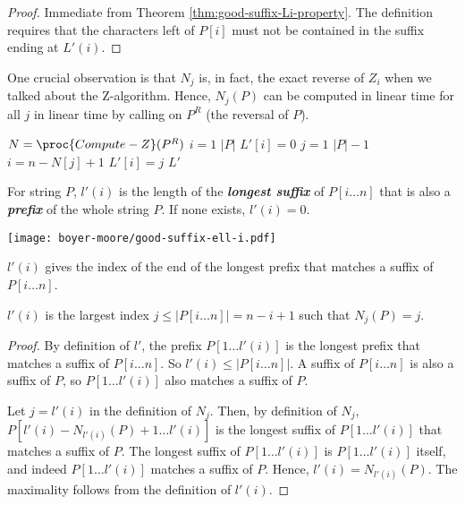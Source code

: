 \begin{proof}
    Immediate from Theorem \ref{thm:good-suffix-Li-property}. The definition requires that the characters left of $P[i]$ must not be contained in the suffix ending at $L'(i)$.
\end{proof}

One crucial observation is that $N_j$ is, in fact, the exact reverse of $Z_i$ when we talked about the Z-algorithm. Hence, $N_j(P)$ can be computed in linear time for all $j$ in linear time by calling  on $P^R$ (the reversal of $P$).

\begin{codebox}
    \li $N = \proc{Compute-Z}(P^R)$
    \li \For $i=1$ \To $|P|$ \Do
        \li $L'[i] = 0$ 
    \End
    \li \For $j = 1$ \To $|P|-1$ \Do
        \li $i = n - N[j] + 1$ 
        \li $L'[i] = j$ 
    \End
    \li \Return $L'$ 
\end{codebox}

\begin{definition}
    For string $P$, $l'(i)$ is the length of the \textit{\textbf{longest suffix}} of $P[i\ldots n]$ that is also a \textit{\textbf{prefix}} of the whole string $P$. If none exists, $l'(i)=0$.
    \begin{marginfigure}
        \texttt{[image: boyer-moore/good-suffix-ell-i.pdf]}
        \caption{$l'(i)$ gives the index of the end of the longest prefix that matches a suffix of $P[i\ldots n]$.}
        \label{fig:good-suffix-ell-i}
    \end{marginfigure}
\end{definition}

\begin{theorem} \label{thm:good-suffix-ell-i-property}
    $l'(i)$ is the largest index $j \leq |P[i\ldots n]| = n-i+1$ such that $N_j(P)=j$.
\end{theorem}

\begin{proof}
    By definition of $l'$, the prefix $P[1\ldots l'(i)]$ is the longest prefix that matches a suffix of $P[i\ldots n]$. So $l'(i) \leq |P[i\ldots n]|$. A suffix of $P[i\ldots n]$ is also a suffix of $P$, so $P[1\ldots l'(i)]$ also matches a suffix of $P$.

    Let $j=l'(i)$ in the definition of $N_j$. Then, by definition of $N_j$, $P[l'(i)-N_{l'(i)}(P)+1\ldots l'(i)]$ is the longest suffix of $P[1\ldots l'(i)]$ that matches a suffix of $P$. The longest suffix of $P[1\ldots l'(i)]$ is $P[1\ldots l'(i)]$ itself, and indeed $P[1\ldots l'(i)]$ matches a suffix of $P$. Hence, $l'(i) = N_{l'(i)}(P)$. The maximality follows from the definition of $l'(i)$.
\end{proof}


